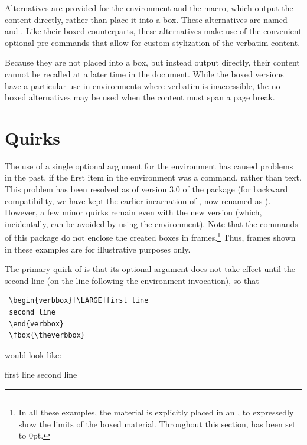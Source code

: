 \documentclass{article}
\newcommand\rl{\rule{1em}{0in}}
\newcommand\margenv[1]{\marginpar{\hfill\ttfamily#1}}
\begin{document}
\begin{myverbbox}{\myvb}
Alternatives are provided for the {\vrbox} environment and the {\vbfbox}
macro, which output the content directly, rather than place it into a
box.  These alternatives are named {\vrnobox}\margenv{\vrnobox} and
{\vbfnobox}\margenv{\vbfnobox}.  Like their boxed counterparts, these
alternatives make use of the convenient optional pre-commands that allow
for custom stylization of the verbatim content.  

Because they are not placed into a box, but instead output directly,
their content cannot be recalled at a later time in the document.  While
the boxed versions have a particular use in environments where verbatim is
inaccessible, the no-boxed alternatives may be used when the content
must span a page break.

\section{Quirks}\fboxsep=0pt

The use of a single optional argument for the {\vrbox} environment has
caused problems in the past, if the first item in the environment was a
command, rather than text.  This problem has been resolved as of version
3.0 of the package (for backward compatibility, we have kept the earlier
incarnation of {\vrbox}, now renamed as \ovrbox).  However, a few minor
quirks remain even with the new version (which, incidentally, can be
avoided by using the {\myvrbox} environment).  Note that the commands of
this package do not enclose the created boxes in frames.\footnote{In all
these examples, the {\fsvrbox} material is explicitly placed in an \fbx,
to expressedly show the limits of the boxed material.  Throughout this
section, {\fbs} has been set to 0pt.} Thus, frames shown in these
examples are for illustrative purposes only.

The primary quirk of {\vrbox} is that its optional argument does not
take effect until the second line (on the line following the environment
invocation), so that

\begin{verbatim}
 \begin{verbbox}[\LARGE]first line
 second line
 \end{verbbox}
 \fbox{\theverbbox}
\end{verbatim}

would look like:\\
\begin{verbbox}[\LARGE]first line
second line
\end{verbbox}
\rl\addvbuffer[3pt 0pt]{\fbox{\theverbbox}}


\end{myverbbox}
\end{document}
